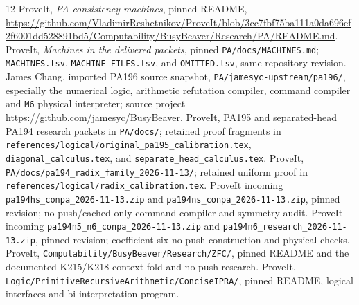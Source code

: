 \documentclass[11pt,letterpaper]{article}
\newcommand{\file}[1]{\nolinkurl{#1}}
\begin{document}
\clearpage
\begin{thebibliography}{12}
 ProveIt, \emph{PA consistency machines}, pinned README,
\url{https://github.com/VladimirReshetnikov/ProveIt/blob/3cc7fbf75ba111a0da696ef2f6001dd528891bd5/Computability/BusyBeaver/Research/PA/README.md}.
 ProveIt, \emph{Machines in the delivered packets}, pinned
\file{PA/docs/MACHINES.md}; \file{MACHINES.tsv}, \file{MACHINE_FILES.tsv}, and
\file{OMITTED.tsv}, same repository revision.
 James Chang, imported PA196 source snapshot,
\file{PA/jamesyc-upstream/pa196/}, especially the numerical logic, arithmetic
refutation compiler, command compiler and \file{M6} physical interpreter;
source project \url{https://github.com/jamesyc/BusyBeaver}.
 ProveIt, PA195 and separated-head PA194 research
packets in \file{PA/docs/}; retained proof fragments in
\file{references/logical/original_pa195_calibration.tex},
\file{diagonal_calculus.tex}, and \file{separate_head_calculus.tex}.
 ProveIt,
\file{PA/docs/pa194_radix_family_2026-11-13/}; retained uniform proof in
\file{references/logical/radix_calibration.tex}.
 ProveIt incoming
\file{pa194hs_conpa_2026-11-13.zip} and \file{pa194ns_conpa_2026-11-13.zip},
pinned revision; no-push/cached-only command compiler and symmetry audit.
 ProveIt incoming
\file{pa194n5_n6_conpa_2026-11-13.zip} and
\file{pa194n6_research_2026-11-13.zip}, pinned revision; coefficient-six
no-push construction and physical checks.
 ProveIt, \file{Computability/BusyBeaver/Research/ZFC/}, pinned
README and the documented K215/K218 context-fold and no-push research.
 ProveIt,
\file{Logic/PrimitiveRecursiveArithmetic/ConciseIPRA/}, pinned README,
logical interfaces and bi-interpretation program.
\end{thebibliography}
\end{document}
